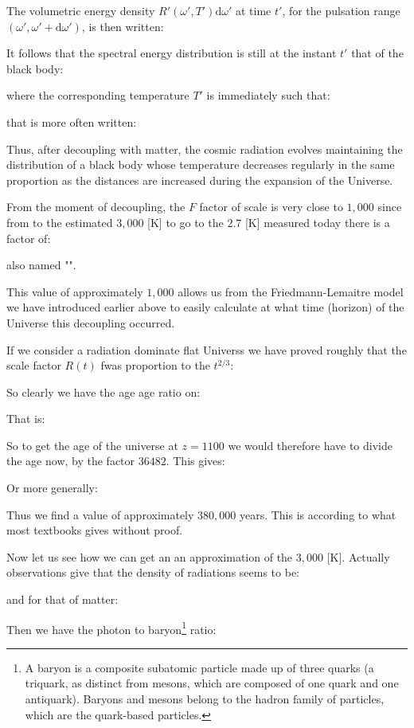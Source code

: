 	The volumetric energy density $R'(\omega',T')\mathrm{d}\omega'$ at time $t'$, for the pulsation range $(\omega',\omega'+\mathrm{d}\omega')$, is then written:
	
	It follows that the spectral energy distribution is still at the instant $t'$ that of the black body:
	
	where the corresponding temperature $T'$ is immediately such that:
	
	that is more often written:
	
	Thus, after decoupling with matter, the cosmic radiation evolves maintaining the distribution of a black body whose temperature decreases regularly in the same proportion as the distances are increased during the expansion of the Universe.

	From the moment of decoupling, the $F$ factor of scale is very close to $1,000$ since from to the estimated $3,000$ [K] to go to the $2.7$ [K] measured today there is a factor of:
	
	also named "".
	
	 This value of approximately $1,000$ allows us from the Friedmann-Lemaitre model we have introduced earlier above to easily calculate at what time (horizon) of the Universe this decoupling occurred.
	 
	 If we consider a radiation dominate flat Universs we have proved roughly that the scale factor $R(t)$ fwas proportion to the $t^{2/3}$:
	
	So clearly we have the age age ratio on:
	
	That is:
	
	So to get the age of the universe at $z=1100$ we would therefore have to divide the age now, by the factor $36482$. This gives:
	
	Or more generally:
	
	 Thus we find a value of approximately $380,000$ years. This is according to what most textbooks gives without proof.
	 
	 Now let us see how we can get an an approximation of the $3,000$ [K]. Actually observations give that the density of radiations seems to be:
	
	and for that of matter:
	
	Then we have the photon to baryon\footnote{A baryon is a composite subatomic particle made up of three quarks (a triquark, as distinct from mesons, which are composed of one quark and one antiquark). Baryons and mesons belong to the hadron family of particles, which are the quark-based particles.} ratio:
	
